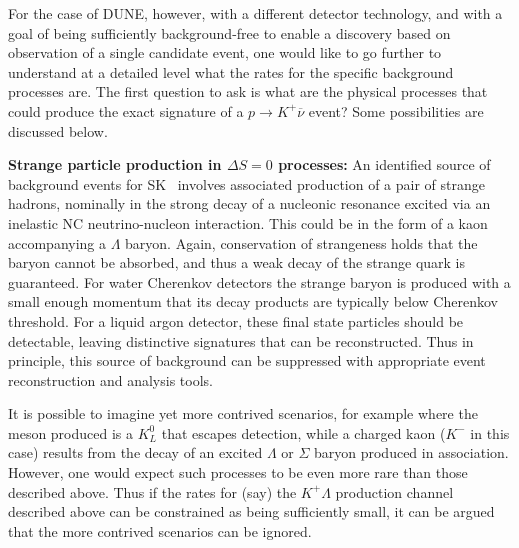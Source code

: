 For the case of DUNE, however, with a different detector 
technology, and with a goal of being sufficiently background-free 
to enable a discovery based on observation of a single candidate  
event, one would like to go further to understand at a detailed 
level what the rates for the specific background processes are. 
The first question to ask is 
what are the physical processes that could 
produce the exact signature of a $p\to K^+\overline{\nu}$ 
event?  Some possibilities are discussed below.  

\textbf{{\boldmath Strange particle production in $\Delta S = 0$ processes:}}
An identified source of background events 
for SK~\cite{Kobayashi:2005pe}
involves associated production of 
a pair of strange hadrons, nominally in the strong decay of a
nucleonic resonance excited 
via an inelastic NC
neutrino-nucleon interaction.  This could be in the form of a kaon 
accompanying a $\Lambda$ baryon.  Again, conservation of 
strangeness holds that the baryon cannot be absorbed, and thus a 
weak decay of the strange quark is guaranteed.  For water Cherenkov 
detectors the strange baryon is produced with a small enough 
momentum that its decay products are typically below Cherenkov 
threshold.  For a liquid argon detector, these final state particles 
should be detectable, leaving distinctive signatures that can be 
reconstructed.  Thus in principle, this source of background 
can be suppressed with appropriate event reconstruction and analysis 
tools.   %

It is possible to imagine yet more contrived scenarios, for example where 
the meson produced is a $K^0_L$ that escapes detection, while a
charged kaon ($K^-$ in this case) results from the decay of an 
excited $\Lambda$ or $\Sigma$ baryon produced in association.
However, one would expect such processes to be even more rare than 
those described above.  Thus if the rates for (say) the $K^+\Lambda$ 
production channel described above can be constrained as being sufficiently 
small, it can be argued that the more contrived scenarios can be ignored.


